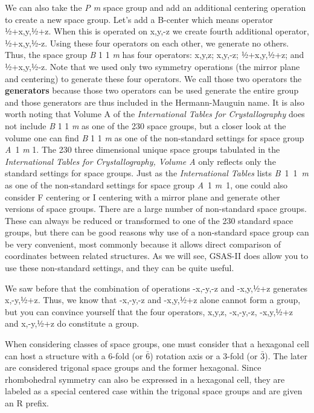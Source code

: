  We can also take the \textit{P m} space group and add an additional centering operation to create a new space group. Let’s add a B-center which means operator ½+x,y,½+z. When this is operated on x,y,-z we create fourth additional operator, ½+x,y,½-z. Using these four operators on each other, we generate no others. Thus, the space group \textit{B }1 1 \textit{m} has four operators: x,y,z; x,y,-z; ½+x,y,½+z; and ½+x,y,½-z. Note that we used only two symmetry operations (the mirror plane and centering) to generate these four operators. We call those two operators the \textbf{generators} because those two operators can be used generate the entire group and those generators are thus included in the Hermann-Mauguin name. It is also worth noting that Volume A of the \textit{International Tables for Crystallography} does not include \textit{B} 1 1 \textit{m} as one of the 230 space groups, but a closer look at the volume one can find \textit{B }1 1 \textit{m} as one of the non-standard settings for space group \textit{A }1 \textit{m }1. 
 The 230 three dimensional unique space groups tabulated in the \textit{International Tables for Crystallography, Volume A} only reflects only the standard settings for space groups. 
 Just as the \textit{International Tables }lists \textit{B}\ 1\ 1\ \textit{m} as one of the non-standard settings for space group \textit{A}\ 1 \textit{m}\ 1, one could also consider F centering or I centering with a mirror plane and generate other versions of space groups. 
 There are a large number of non-standard space groups. 
 These can always be reduced or transformed to one of the 230 standard space groups, but there can be good reasons why use of a non-standard space group can be very convenient, most commonly because it allows direct comparison of coordinates between related structures. 
 As we will see, GSAS-II does allow you to use these non-standard settings, and they can be quite useful. 

 We saw before that the combination of operations -x,-y,-z and -x,y,½+z generates x,-y,½+z. Thus, we know that -x,-y,-z and -x,y,½+z alone cannot form a group, but you can convince yourself that the four operators, x,y,z, -x,-y,-z, -x,y,½+z and x,-y,½+z do constitute a group. 

 When considering classes of space groups, one must consider that a hexagonal cell can host a structure with a 6-fold (or $\bar{6}$) rotation axis or a 3-fold (or $\bar{3}$). The later are considered trigonal space groups and the former hexagonal. Since rhombohedral symmetry can also be expressed in a hexagonal cell, they are labeled as a special centered case within the trigonal space groups and are given an R prefix. 

